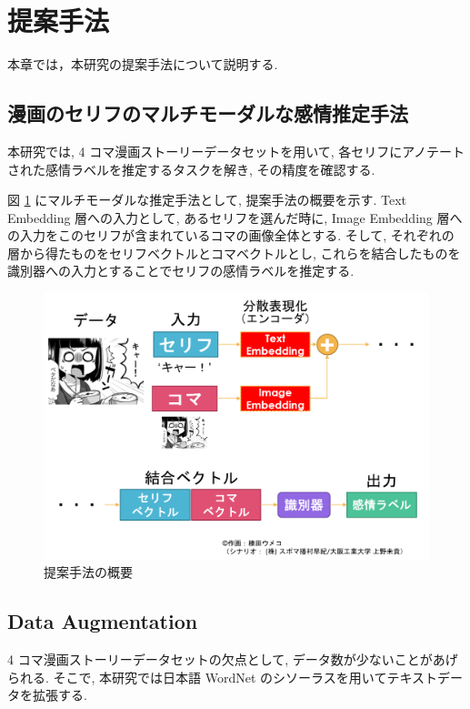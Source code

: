 \newpage
\changeindent{0cm}
\section{提案手法}
\changeindent{2cm}

本章では，本研究の提案手法について説明する.

\changeindent{0cm}
\subsection{漫画のセリフのマルチモーダルな感情推定手法}
\changeindent{2cm}

本研究では, 4 コマ漫画ストーリーデータセットを用いて,
各セリフにアノテートされた感情ラベルを推定するタスクを解き, その精度を確認する.

図 \ref{fig:teian} にマルチモーダルな推定手法として, 提案手法の概要を示す.
Text Embedding 層への入力として, あるセリフを選んだ時に, Image Embedding 層への入力をこのセリフが含まれているコマの画像全体とする. そして, それぞれの層から得たものをセリフベクトルとコマベクトルとし, これらを結合したものを識別器への入力とすることでセリフの感情ラベルを推定する.

\begin{figure}[h]
  \centering
  \includegraphics[width=0.8\hsize]{doc/figures/teian_2.png}
  \caption{提案手法の概要}
  \label{fig:teian}
\end{figure}

\newpage
\changeindent{0cm}
\subsection{Data Augmentation}
\changeindent{2cm}

4 コマ漫画ストーリーデータセットの欠点として, データ数が少ないことがあげられる.
そこで, 本研究では日本語 WordNet \cite{word_net_jp} のシソーラスを用いてテキストデータを拡張する.

